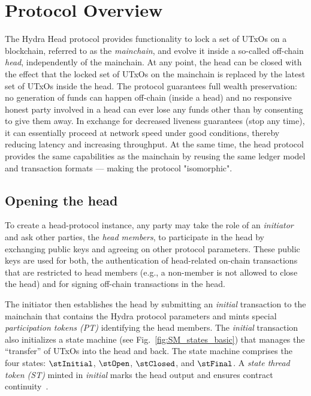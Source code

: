 \section{Protocol Overview}\label{sec:overview}

The Hydra Head protocol provides functionality to lock a set of UTxOs on a
blockchain, referred to as the \emph{mainchain}, and evolve it inside a
so-called off-chain \emph{head}, independently of the mainchain. At any point,
the head can be closed with the effect that the locked set of UTxOs on the
mainchain is replaced by the latest set of UTxOs inside the head. The protocol
guarantees full wealth preservation: no generation of funds can happen off-chain
(inside a head) and no responsive honest party involved in a head can ever lose
any funds other than by consenting to give them away. In exchange for decreased
liveness guarantees (stop any time), it can essentially proceed at network speed
under good conditions, thereby reducing latency and increasing throughput. At the
same time, the head protocol provides the same capabilities as the mainchain by
reusing the same ledger model and transaction formats --- making the protocol
"isomorphic".

\subsection{Opening the head}

To create a head-protocol instance, any party may take the role of an
\emph{initiator} and ask other parties, the \emph{head members}, to participate
in the head by exchanging public keys and agreeing on other protocol parameters.
These public keys are used for both, the authentication of head-related on-chain
transactions that are restricted to head members (e.g., a non-member is not
allowed to close the head) and for signing off-chain transactions in the head.

The initiator then establishes the head by submitting an \emph{initial}
transaction to the mainchain that contains the Hydra protocol parameters and mints special
\emph{participation tokens (PT)} identifying the head members. The
\emph{initial} transaction also initializes a state machine (see
Fig.~\ref{fig:SM_states_basic}) that manages the ``transfer'' of UTxOs into the
head and back. The state machine comprises the four states: $\stInitial$,
$\stOpen$, $\stClosed$, and $\stFinal$. A \emph{state thread token (ST)} minted
in \emph{initial} marks the head output and ensures contract continuity~\cite{eutxo}.

